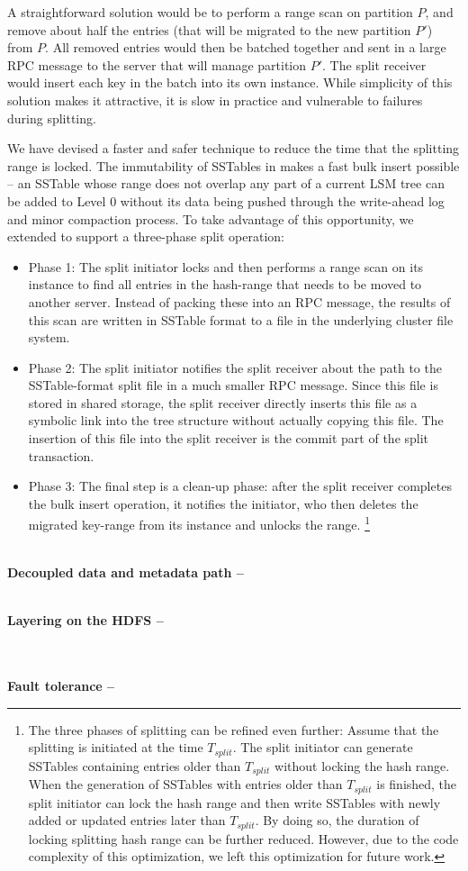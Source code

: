 A straightforward solution would be to perform a range scan on
partition $P$, and remove about half the entries
(that will be migrated to the new partition $P'$) from $P$.
All removed entries would then be batched together
and sent in a large RPC message to the server that will manage partition $P'$.
The split receiver would insert each key in the batch into its own \tfs instance.
While simplicity of this solution makes it attractive,
it is slow in practice and vulnerable to failures during splitting.

We have devised a faster and safer technique to
reduce the time that the splitting range is locked.
The immutability of SSTables in \ldb makes a fast bulk insert possible --
an SSTable whose range does not overlap any part of a current LSM tree
can be added to Level 0 without its data being pushed through the
write-ahead log and minor compaction process.
To take advantage of this opportunity, we extended \tfs
to support a three-phase \giga split operation:

\begin{itemize}
\item{Phase 1:} The split initiator locks and
then performs a range scan on its \tfs instance
to find all entries in the hash-range that needs to be moved to another server.
Instead of packing these into an RPC message,
the results of this scan are written in SSTable format to a file in the
underlying cluster file system.

\item{Phase 2:} The split initiator notifies the split receiver about
the path to the SSTable-format split file in a much smaller RPC message.
Since this file is stored in shared storage,
the split receiver directly inserts this file as a symbolic link
into the \ldb tree structure without actually copying this file.
The insertion of this file into the split receiver is the commit
part of the split transaction.

\item{Phase 3:} The final step is a clean-up phase:
after the split receiver completes the bulk insert operation, it notifies the
initiator, who then deletes the migrated key-range from its \tfs instance
and unlocks the range.
\footnote{The three phases of splitting can be refined even further:
Assume that the splitting is initiated at the time $T_{split}$.
The split initiator can generate SSTables containing entries
older than $T_{split}$ without locking the hash range.
When the generation of SSTables with entries older than $T_{split}$ is finished,
the split initiator can lock the hash range and then write SSTables with
newly added or updated entries later than $T_{split}$.
By doing so, the duration of locking splitting hash range can be further reduced.
However, due to the code complexity of this optimization,
we left this optimization for future work.}

\end{itemize}


~\\
\textbf{Decoupled data and metadata path -- }

~\\
\textbf{Layering on the HDFS -- }

~\\
~\\
\textbf{Fault tolerance -- }

